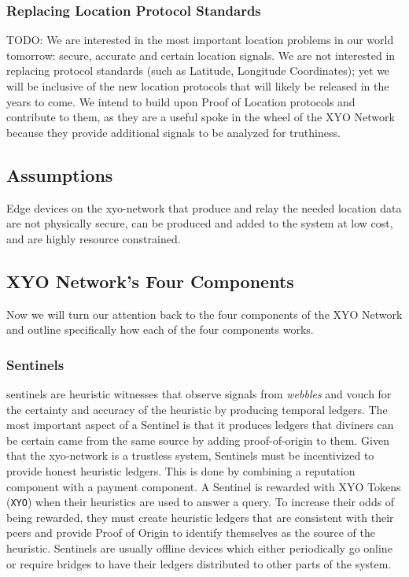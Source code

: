 \documentclass{article}
\begin{document}
\subsubsection {Replacing Location Protocol Standards}
TODO: We are interested in the most important location problems in our world tomorrow: secure, accurate and certain location signals. We are not interested in replacing protocol standards (such as Latitude, Longitude Coordinates); yet we will be inclusive of the new location protocols that will likely be released in the years to come. We intend to build upon Proof of Location protocols and contribute to them, as they are a useful spoke in the wheel of the XYO Network because they provide additional signals to be analyzed for truthiness.

\subsection {Assumptions}
Edge devices on the \Gls{xyo-network} that produce and relay the needed location data are not physically secure, can be produced and added to the system at low cost, and are highly resource constrained.

\subsection {XYO Network's Four Components}

Now we will turn our attention back to the four components of the XYO Network and outline specifically how each of the four components works.

\subsubsection {Sentinels}
\Glspl{sentinel} are \gls{heuristic} witnesses that observe signals from \textit{webbles} and vouch for the \gls{certainty} and \gls{accuracy} of the heuristic by producing temporal ledgers. The most important aspect of a Sentinel is that it produces ledgers that \Glspl{diviner} can be certain came from the same source by adding \Gls{proof-of-origin} to them. Given that the \Gls{xyo-network} is a trustless system, Sentinels must be incentivized to provide honest heuristic ledgers. This is done by combining a reputation component with a payment component. A Sentinel is rewarded with XYO Tokens (\texttt{XYO}) when their heuristics are used to answer a query. To increase their odds of being rewarded, they must create heuristic ledgers that are consistent with their peers and provide Proof of Origin to identify themselves as the source of the heuristic. Sentinels are usually offline devices which either periodically go online or require \Glspl{bridge} to have their ledgers distributed to other parts of the system.
\end{document}

